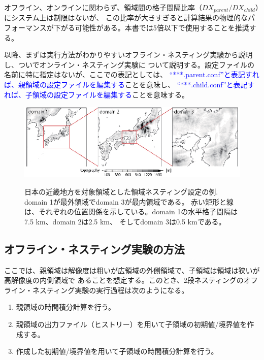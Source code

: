 オフライン、オンラインに関わらず、領域間の格子間隔比率（$DX_{parent}/DX_{child}$）にシステム上は制限はないが、
この比率が大きすぎると計算結果の物理的なパフォーマンスが下がる可能性がある。本書では5倍以下で使用することを推奨する。

以降、まずは実行方法がわかりやすいオフライン・ネスティング実験から説明し、ついでオンライン・ネスティング実験に
ついて説明する。設定ファイルの名前に特に指定はないが、ここでの表記としては、
\textcolor{blue}{``***.parent.conf''と表記すれば、親領域の設定ファイルを編集する}ことを意味し、
\textcolor{blue}{``***.child.conf''と表記すれば、子領域の設定ファイルを編集する}ことを意味する。


\begin{figure}[t]
\begin{center}
  \includegraphics[width=1.0\hsize]{./figure/nesting_sample.eps}\\
  \caption{日本の近畿地方を対象領域とした領域ネスティング設定の例. domain 1が最外領域でdomain 3が最内領域である。
           赤い矩形と線は、それぞれの位置関係を示している。domain 1の水平格子間隔は7.5 km、domain 2は2.5 km、
           そしてdomain 3は0.5 kmである。}
  \label{fig_nestsample}
\end{center}
\end{figure}


\subsection{オフライン・ネスティング実験の方法} \label{sec:nest_offline}

ここでは、親領域は解像度は粗いが広領域の外側領域で、子領域は領域は狭いが高解像度の内側領域で
あることを想定する。このとき、2段ネスティングのオフライン・ネスティング実験の実行過程は次のようになる。

{\gt
\begin{enumerate}
 \item 親領域の時間積分計算を行う。
 \item 親領域の出力ファイル（ヒストリー）を用いて子領域の初期値/境界値を作成する。
 \item 作成した初期値/境界値を用いて子領域の時間積分計算を行う。
\end{enumerate}
}

